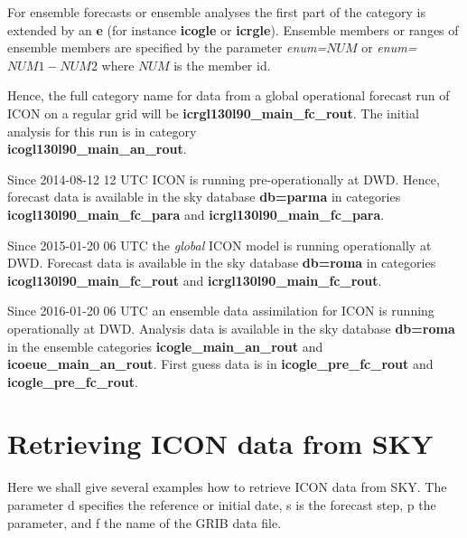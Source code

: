 For ensemble forecasts or ensemble analyses the first part of the
category is extended by an \textbf{e} (for instance \textbf{icogle}
or \textbf{icrgle}). Ensemble members or ranges of ensemble members
are specified by the parameter \emph{enum=}$NUM$
or \emph{enum=}$NUM1-NUM2$ where $NUM$ is the member id.

Hence, the full category name for data from a global operational forecast run of ICON on a
regular grid will be \textbf{icrgl130l90\_main\_fc\_rout}. The initial analysis for this
run is in category\\ \textbf{icogl130l90\_main\_an\_rout}.

\begin{note}
Since 2014-08-12 12 UTC ICON is running pre-operationally at DWD. Hence, forecast data
is available in the sky database \textbf{db=parma} in categories
\textbf{icogl130l90\_main\_fc\_para} and \textbf{icrgl130l90\_main\_fc\_para}.
\end{note}

\begin{note}
Since 2015-01-20 06 UTC the \emph{global} ICON model is running operationally at DWD.
Forecast data is available in the sky database \textbf{db=roma} in categories
\textbf{icogl130l90\_main\_fc\_rout} and \textbf{icrgl130l90\_main\_fc\_rout}.
\end{note}

\begin{note}
Since 2016-01-20 06 UTC an ensemble data assimilation for ICON is running operationally at DWD.
Analysis data is available in the sky database \textbf{db=roma} in the ensemble categories
\textbf{icogle\_main\_an\_rout} and \textbf{icoeue\_main\_an\_rout}.
First guess data is in \textbf{icogle\_pre\_fc\_rout} and
                       \textbf{icogle\_pre\_fc\_rout}.
\end{note}

\section{Retrieving ICON data from SKY}\label{sec_example}

Here we shall give several examples how to retrieve ICON data from SKY.
The parameter d specifies the reference or initial date, s is the forecast step, p the parameter,
and f the name of the GRIB data file.

